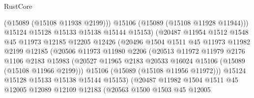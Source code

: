 \begin{lexlean}{RustCore}
\begin{coremodule}
                                (@15089 (@15108 @11938 @2199)))
                              @15106
                              (@15089 (@15108 @11928 @11944)))
                            @15124
                            @15128
                            @15133
                            @15138
                            @15144
                            @15153)
                          (@20487
                            @11954
                            @1512
                            @1548
                            @45
                            @11973
                            @12185
                            @12205
                            @12426
                            (@20496
                              @1504
                              @1511
                              @45
                              @11973
                              @11982
                              @2199
                              @12185
                              (@20506
                                @11973
                                @11980
                                @2206
                                (@20513
                                  @11972
                                  @11979
                                  @2176
                                  @1106
                                  @2183
                                  @15983
                                  (@20527
                                    @11965
                                    @2183
                                    @20533
                                    @16024
                                    @15106
                                    (@15089 (@15108 @11966 @2199)))
                                  @15106
                                  (@15089 (@15108 @11956 @11972)))
                                @15124
                                @15128
                                @15133
                                @15138
                                @15144
                                @15153)
                              (@20487
                                @11982
                                @1504
                                @1511
                                @45
                                @12005
                                @12089
                                @12109
                                @12183
                                (@20563
                                  @1500
                                  @1503
                                  @45
                                  @12005

\end{coremodule}
\end{lexlean}
